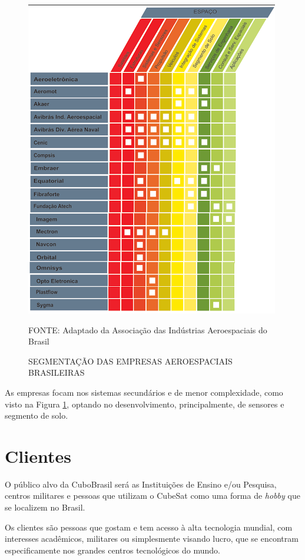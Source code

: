 \documentclass[
	12pt,				%
	openright,			%
	oneside,			%
	a4paper,			%
	english,			%
	french,				%
	spanish,			%
	brazil				%
	]{abntex2}
\begin{document}
	\begin{figure}[th]
		\caption{SEGMENTAÇÃO DAS EMPRESAS AEROESPACIAIS BRASILEIRAS}
		\label{Segmentação}
		\centering
		\includegraphics[width=0.8\linewidth]{./figs/Figura_08}
			
		\begin{small}
			FONTE: Adaptado da Associação das Indústrias Aeroespaciais do Brasil
		\end{small}		
	\end{figure}
		
	As empresas focam nos sistemas secundários e de menor complexidade, como visto na Figura \ref{Segmentação}, optando no desenvolvimento, principalmente, de sensores e segmento de solo.
		
\section[Clientes]{Clientes}

	O público alvo da CuboBrasil será as Instituições de Ensino e/ou Pesquisa, centros militares e pessoas que utilizam o CubeSat como uma forma de \textit{hobby} que se localizem no Brasil.
	
	Os clientes são pessoas que gostam e tem acesso à alta tecnologia mundial, com interesses acadêmicos, militares ou simplesmente visando lucro, que se encontram especificamente nos grandes centros tecnológicos do mundo.
\end{document}
